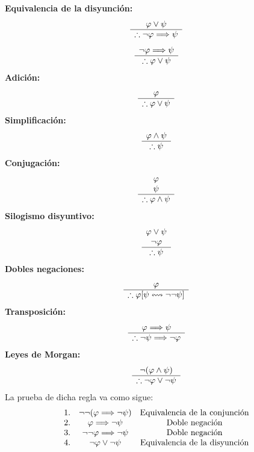\textbf{Equivalencia de la disyunción:}
\[
    \begin{array}{c}
      \varphi\lor\psi\\
      \hline
      \therefore \neg\varphi\Longrightarrow\psi
    \end{array}
\]
\[
    \begin{array}{c}
      \neg\varphi\Longrightarrow\psi\\
      \hline
      \therefore \varphi\lor\psi
    \end{array}
\]
\textbf{Adición:}
\[
    \begin{array}{c}
      \varphi\\
      \hline
      \therefore \varphi\lor\psi
    \end{array}
\]
\textbf{Simplificación:}
\[
    \begin{array}{c}
      \varphi\land \psi\\
      \hline
      \therefore\psi
    \end{array}
\]
\textbf{Conjugación:}
\[
    \begin{array}{c}
      \varphi\\
      \psi\\
      \hline
      \therefore \varphi\land\psi
    \end{array}
\]
\textbf{Silogismo disyuntivo:}
\[
    \begin{array}{c}
      \varphi\lor\psi\\
      \neg\varphi\\
      \hline
      \therefore\psi
    \end{array}
\]
\textbf{Dobles negaciones:}
\[
    \begin{array}{c}
      \varphi\\
      \hline
      \therefore \varphi[\psi\leftrightsquigarrow \neg\neg\psi]
    \end{array}
\]
\textbf{Transposición:}
\[
    \begin{array}{c}
      \varphi\Longrightarrow\psi\\
      \hline
      \therefore \neg\psi\Longrightarrow\neg\varphi
    \end{array}
\]
\textbf{Leyes de Morgan:}
\[
    \begin{array}{c}
      \neg(\varphi\land\psi)\\
      \hline
      \therefore \neg\varphi\lor\neg\psi
    \end{array}
\]
La prueba de dicha regla va como sigue:
\[
    \begin{array}{c c c}
        1. & \neg\neg(\varphi\Longrightarrow\neg\psi) & \text{Equivalencia de la conjunción}\\
        2. & \varphi\Longrightarrow\neg\psi & \text{Doble negación}\\
        3. & \neg\neg\varphi\Longrightarrow\neg\psi & \text{Doble negación}\\
        4. & \neg\varphi\lor\neg\psi & \text{Equivalencia de la disyunción}
    \end{array}
\]
